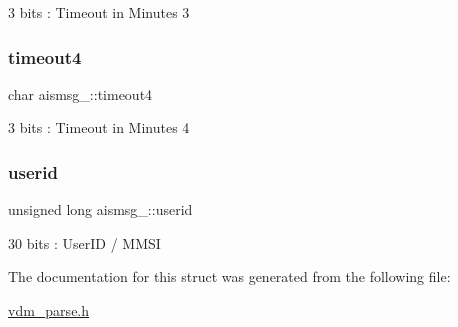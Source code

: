 3 bits \+: Timeout in Minutes 3 

\mbox{\label{structaismsg__20_a8dac791855bd8ad2c16d510af2249a49}} 
\subsubsection{\texorpdfstring{timeout4}{timeout4}}
{\footnotesize\ttfamily char aismsg\+\_\+::timeout4}



3 bits \+: Timeout in Minutes 4 

\mbox{\label{structaismsg__20_a8e37854d7dcf380ed6735a19190c2809}} 
\subsubsection{\texorpdfstring{userid}{userid}}
{\footnotesize\ttfamily unsigned long aismsg\+\_\+::userid}



30 bits \+: User\+ID / M\+M\+SI 



The documentation for this struct was generated from the following file\+:\begin{DoxyCompactItemize}
\item 
\mbox{\hyperlink{vdm__parse_8h}{vdm\+\_\+parse.\+h}}\end{DoxyCompactItemize}
